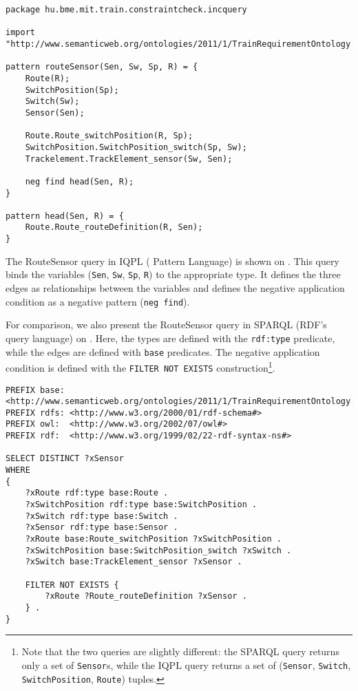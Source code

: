 \lstset{language=viatra}

\begin{lstlisting}[caption=The RouteSensor query in IQPL, label=lst:routesensor-iqpl]
package hu.bme.mit.train.constraintcheck.incquery

import "http://www.semanticweb.org/ontologies/2011/1/TrainRequirementOntology.owl" 

pattern routeSensor(Sen, Sw, Sp, R) = {
	Route(R);
	SwitchPosition(Sp);
	Switch(Sw);
	Sensor(Sen);
	
	Route.Route_switchPosition(R, Sp);
	SwitchPosition.SwitchPosition_switch(Sp, Sw);
	Trackelement.TrackElement_sensor(Sw, Sen);
	
	neg find head(Sen, R);	
}

pattern head(Sen, R) = {
	Route.Route_routeDefinition(R, Sen);
}
\end{lstlisting}

The RouteSensor query in IQPL (\iq{} Pattern Language) %
is shown on . This query binds the variables (\texttt{Sen}, \texttt{Sw}, \texttt{Sp}, \texttt{R}) to the appropriate type. It defines the three edges as relationships between the variables and defines the negative application condition as a negative pattern (\texttt{neg find}).

For comparison, we also present the RouteSensor query in SPARQL (RDF's query language) on . Here, the types are defined with the \texttt{rdf:type} predicate, while the edges are defined with \texttt{base} predicates. The negative application condition is defined with the \texttt{FILTER NOT EXISTS} construction\footnote{Note that the two queries are slightly different: the SPARQL query returns only a set of \texttt{Sensor}s, while the IQPL query returns a set of (\texttt{Sensor}, \texttt{Switch}, \texttt{SwitchPosition}, \texttt{Route}) tuples.}.


\begin{lstlisting}[caption=The RouteSensor query in SPARQL, label=lst:routesensor-sparql]
PREFIX base: <http://www.semanticweb.org/ontologies/2011/1/TrainRequirementOntology.owl#>
PREFIX rdfs: <http://www.w3.org/2000/01/rdf-schema#>
PREFIX owl:  <http://www.w3.org/2002/07/owl#>
PREFIX rdf:  <http://www.w3.org/1999/02/22-rdf-syntax-ns#>

SELECT DISTINCT ?xSensor
WHERE
{
    ?xRoute rdf:type base:Route .
    ?xSwitchPosition rdf:type base:SwitchPosition .
    ?xSwitch rdf:type base:Switch .
    ?xSensor rdf:type base:Sensor .
    ?xRoute base:Route_switchPosition ?xSwitchPosition .
    ?xSwitchPosition base:SwitchPosition_switch ?xSwitch .
    ?xSwitch base:TrackElement_sensor ?xSensor .

    FILTER NOT EXISTS {
        ?xRoute ?Route_routeDefinition ?xSensor .
    } .
}
\end{lstlisting}


